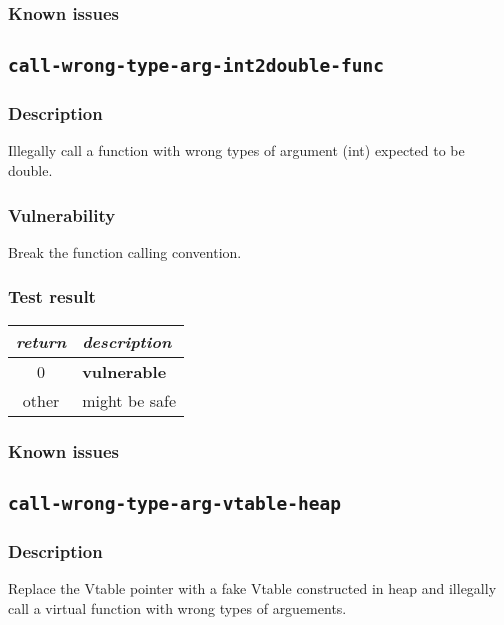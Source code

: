 \documentclass[a4paper]{book}
\begin{document}
\subsubsection{Known issues}

\newpage
\subsection{\texttt{call-wrong-type-arg-int2double-func}}\label{test-call-wrong-type-arg-int2double-func}

\subsubsection{Description}
Illegally call a function with wrong types of argument (int) expected to be double.

\subsubsection{Vulnerability}
Break the function calling convention.

\subsubsection{Test result}
\begin{tabular}{cl}
  \toprule
  \emph{return}  & \emph{description} \\
  \midrule
  0              & \textbf{vulnerable} \\
  other          & might be safe \\
  \bottomrule
\end{tabular}

\subsubsection{Known issues}

\newpage
\subsection{\texttt{call-wrong-type-arg-vtable-heap}}\label{test-call-wrong-type-arg-vtable-heap}

\subsubsection{Description}
Replace the Vtable pointer with a fake Vtable constructed in heap and
illegally call a virtual function with wrong types of arguements.
\end{document}
